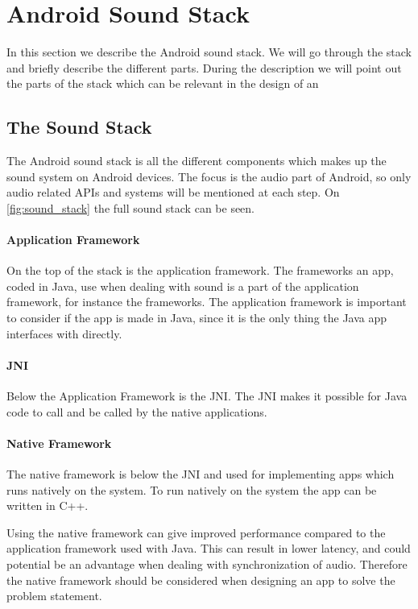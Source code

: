 \section{Android Sound Stack}
In this section we describe the Android sound stack.
We will go through the stack and briefly describe the different parts.
During the description we will point out the parts of the stack which can be relevant in the design of an 

\subsection{The Sound Stack}
The Android sound stack is all the different components which makes up the sound system on Android devices.
The focus is the audio part of Android, so only audio related \acp{API} and systems will be mentioned at each step. 
On \cref{fig:sound_stack} the full sound stack can be seen.

\paragraph{Application Framework}
On the top of the stack is the application framework.
The frameworks an app, coded in Java, use when dealing with sound is a part of the application framework,
for instance the  frameworks.
The application framework is important to consider if the app is made in Java,
since it is the only thing the Java app interfaces with directly.%

\paragraph{JNI}
Below the Application Framework is the \ac{JNI}.
The \ac{JNI} makes it possible for Java code to call and be called by the native applications\cite{jni}.

\paragraph{Native Framework}
The native framework is below the \ac{JNI} and used for implementing apps which runs natively on the system.
To run natively on the system the app can be written in C++.

Using the native framework can give improved performance compared to the application framework used with Java\cite{nat_perf_2}.
This can result in lower latency, and could potential be an advantage when dealing with synchronization of audio.
Therefore the native framework should be considered when designing an app to solve the problem statement.

